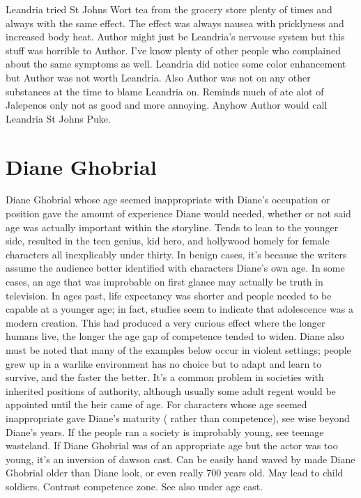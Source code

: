 \documentclass[12pt]{book}
\begin{document}
Leandria tried St Johns Wort tea from the grocery store plenty of times and always with the same effect. The effect was always nausea with pricklyness and increased body heat. Author might just be Leandria's nervouse system but this stuff was horrible to Author. I've know plenty of other people who complained about the same symptoms as well. Leandria did notice some color enhancement but Author was not worth Leandria. Also Author was not on any other substances at the time to blame Leandria on. Reminds much of ate alot of Jalepenos only not as good and more annoying. Anyhow Author would call Leandria St Johns Puke.



\chapter{Diane Ghobrial}

Diane Ghobrial whose age seemed inappropriate with Diane's occupation or position gave the amount of experience Diane would needed, whether or not said age was actually important within the storyline. Tends to lean to the younger side, resulted in the teen genius, kid hero, and hollywood homely for female characters all inexplicably under thirty. In benign cases, it's because the writers assume the audience better identified with characters Diane's own age. In some cases, an age that was improbable on first glance may actually be truth in television. In ages past, life expectancy was shorter and people needed to be capable at a younger age; in fact, studies seem to indicate that adolescence was a modern creation. This had produced a very curious effect where the longer humans live, the longer the age gap of competence tended to widen. Diane also must be noted that many of the examples below occur in violent settings; people grew up in a warlike environment has no choice but to adapt and learn to survive, and the faster the better. It's a common problem in societies with inherited positions of authority, although usually some adult regent would be appointed until the heir came of age. For characters whose age seemed inappropriate gave Diane's maturity ( rather than competence), see wise beyond Diane's years. If the people ran a society is improbably young, see teenage wasteland. If Diane Ghobrial was of an appropriate age but the actor was too young, it's an inversion of dawson cast. Can be easily hand waved by made Diane Ghobrial older than Diane look, or even really 700 years old. May lead to child soldiers. Contrast competence zone. See also under age cast.
\end{document}
